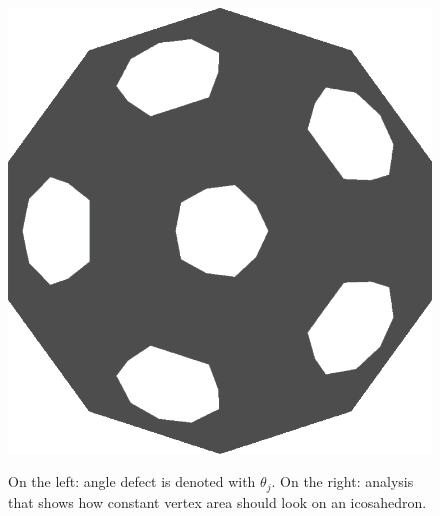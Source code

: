 \begin{figure}[!h]
    \includegraphics[scale=0.13]{images/gaussian-ball.png}
    \label{fig:gc-icosahedron}
    \endminipage
    \caption{On the left: angle defect is denoted with $\theta_j$. On the right: analysis that shows how constant vertex area should look on an icosahedron.}
\end{figure}


